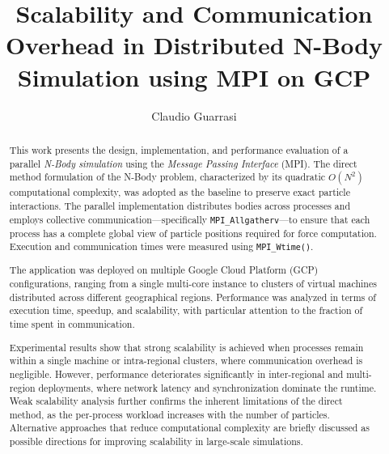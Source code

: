 \documentclass{article}
\title{\textbf{Scalability and Communication Overhead in Distributed N-Body Simulation using MPI on GCP}\\}
\author{Claudio Guarrasi\\[1ex]}
\date{%
	\today
	\vspace{-0.25cm}
	\\
	\rule{\textwidth}{0.3pt}}
\begin{document}
\begin{titlingpage}

\maketitle %
\thispagestyle{empty} %
\begin{abstract}
This work presents the design, implementation, and performance evaluation of a parallel \emph{N-Body simulation} using the \emph{Message Passing Interface} (MPI).  
The direct method formulation of the N-Body problem, characterized by its quadratic $O(N^2)$ computational complexity, was adopted as the baseline to preserve exact particle interactions.  
The parallel implementation distributes bodies across processes and employs collective communication---specifically \texttt{MPI\_Allgatherv}---to ensure that each process has a complete global view of particle positions required for force computation.  
Execution and communication times were measured using \texttt{MPI\_Wtime()}.

The application was deployed on multiple Google Cloud Platform (GCP) configurations, ranging from a single multi-core instance to clusters of virtual machines distributed across different geographical regions.  
Performance was analyzed in terms of execution time, speedup, and scalability, with particular attention to the fraction of time spent in communication.

Experimental results show that strong scalability is achieved when processes remain within a single machine or intra-regional clusters, where communication overhead is negligible.  
However, performance deteriorates significantly in inter-regional and multi-region deployments, where network latency and synchronization dominate the runtime.  
Weak scalability analysis further confirms the inherent limitations of the direct method, as the per-process workload increases with the number of particles.  
Alternative approaches that reduce computational complexity are briefly discussed as possible directions for improving scalability in large-scale simulations.
\end{abstract}



\end{titlingpage}
\end{document}
